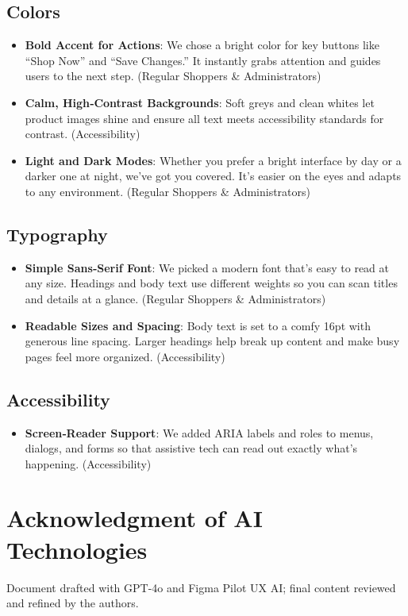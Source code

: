\documentclass[11pt,a4paper]{article}
\begin{document}
\subsection{Colors}
\begin{itemize}
	\item \textbf{Bold Accent for Actions}: We chose a bright color for key buttons like “Shop Now” and “Save Changes.” It instantly grabs attention and guides users to the next step. (Regular Shoppers \& Administrators)
	\item \textbf{Calm, High‑Contrast Backgrounds}: Soft greys and clean whites let product images shine and ensure all text meets accessibility standards for contrast. (Accessibility)
	\item \textbf{Light and Dark Modes}: Whether you prefer a bright interface by day or a darker one at night, we’ve got you covered. It’s easier on the eyes and adapts to any environment. (Regular Shoppers \& Administrators)
\end{itemize}

\subsection{Typography}
\begin{itemize}
	\item \textbf{Simple Sans‑Serif Font}: We picked a modern font that’s easy to read at any size. Headings and body text use different weights so you can scan titles and details at a glance. (Regular Shoppers \& Administrators)
	\item \textbf{Readable Sizes and Spacing}: Body text is set to a comfy 16pt with generous line spacing. Larger headings help break up content and make busy pages feel more organized. (Accessibility)
\end{itemize}

\subsection{Accessibility}
\begin{itemize}

	\item \textbf{Screen‑Reader Support}: We added ARIA labels and roles to menus, dialogs, and forms so that assistive tech can read out exactly what’s happening. (Accessibility)


\end{itemize}



	\section{Acknowledgment of AI Technologies}\label{sec:acknowledgment-of-ai-technologies}
	Document drafted with GPT-4o and Figma Pilot UX AI; final content reviewed and refined by the authors.







	
\end{document}
